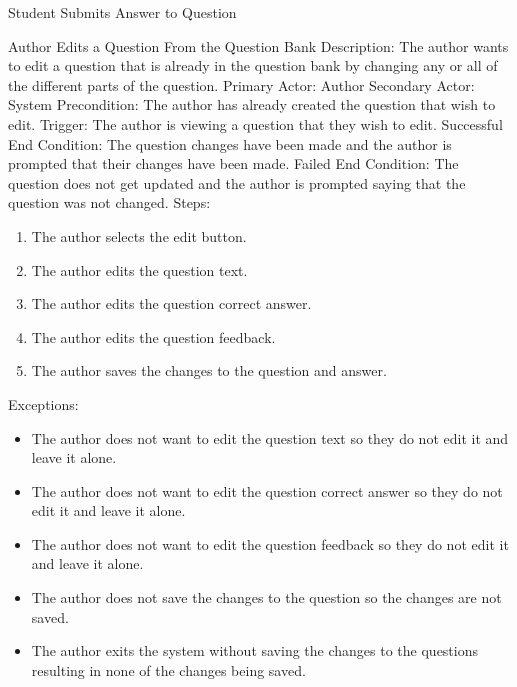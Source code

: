 \begin{section}{Student Submits Answer to Question}
    
    
    \begin{section}{Author Edits a Question From the Question Bank}
        Description: The author wants to edit a question that is already in the question bank by changing any or all of the different parts of the question. \newline
        Primary Actor: Author \newline
        Secondary Actor: System \newline
        Precondition: The author has already created the question that wish to edit. \newline
        Trigger: The author is viewing a question that they wish to edit. \newline
        Successful End Condition: The question changes have been made and the author is prompted that their changes have been made. \newline
        Failed End Condition: The question does not get updated and the author is prompted saying that the question was not changed. \newline
        \newline
        Steps:
        \begin{enumerate}
            \item{The author selects the edit button.}
            \item{The author edits the question text.}
            \item{The author edits the question correct answer.}
            \item{The author edits the question feedback.}
            \item{The author saves the changes to the question and answer.}
        \end{enumerate}
        Exceptions:
        \begin{itemize}
            \item{The author does not want to edit the question text so they do not edit it and leave it alone.}
            \item{The author does not want to edit the question correct answer so they do not edit it and leave it alone.}
            \item{The author does not want to edit the question feedback so they do not edit it and leave it alone.}
            \item{The author does not save the changes to the question so the changes are not saved.}
            \item{The author exits the system without saving the changes to the questions resulting in none of the changes being saved.}
        \end{itemize}
    \end{section}
    

\end{section}
